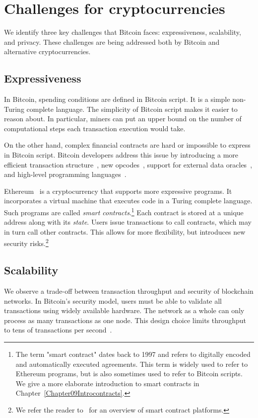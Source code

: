 \section{Challenges for cryptocurrencies}

We identify three key challenges that Bitcoin faces: expressiveness, scalability, and privacy.
These challenges are being addressed both by Bitcoin and alternative cryptocurrencies.


\subsection{Expressiveness}

In Bitcoin, spending conditions are defined in Bitcoin script.
It is a simple non-Turing complete language.
The simplicity of Bitcoin script makes it easier to reason about.
In particular, miners can put an upper bound on the number of computational steps each transaction execution would take.

On the other hand, complex financial contracts are hard or impossible to express in Bitcoin script.
Bitcoin developers address this issue by introducing a more efficient transaction structure~\cite{Wuille2020}, new opcodes~\cite{Rubin2020}, support for external data oracles~\cite{Dryja}, and high-level programming languages~\cite{OConnor2017, Wuille2019}.

Ethereum~\cite{Buterin2014, Wood2014} is a cryptocurrency that supports more expressive programs.
It incorporates a virtual machine that executes code in a Turing complete language.
Such programs are called \textit{smart contracts}.\footnote{The term "smart contract" dates back to 1997 and refers to digitally encoded and automatically executed agreements. This term is widely used to refer to Ethereum programs, but is also sometimes used to refer to Bitcoin scripts. We give a more elaborate introduction to smart contracts in Chapter~\ref{Chapter09Introcontracts}.}
Each contract is stored at a unique address along with its \textit{state}.
Users issue transactions to call contracts, which may in turn call other contracts.
This allows for more flexibility, but introduces new security risks.\footnote{We refer the reader to~\cite{Bartoletti2017} for an overview of smart contract platforms.}


\subsection{Scalability}

We observe a trade-off between transaction throughput and security of blockchain networks.
In Bitcoin's security model, users must be able to validate all transactions using widely available hardware.
The network as a whole can only process as many transactions as one node.
This design choice limits throughput to tens of transactions per second~\cite{Croman2016}.

